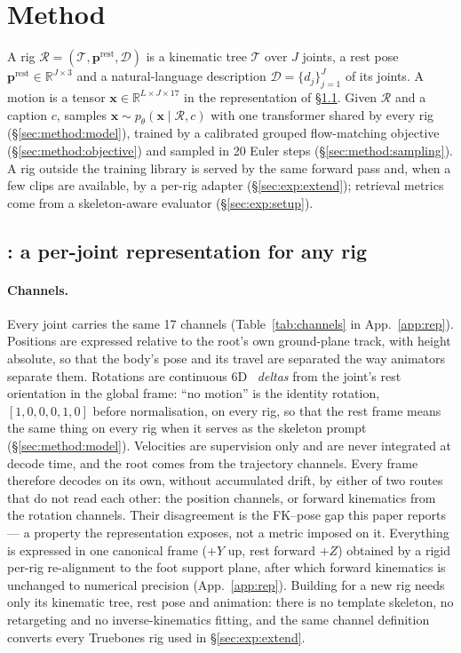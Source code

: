 \section{Method}\label{sec:method}

A rig $\mathcal{R}=(\mathcal{T},\mathbf{p}^{\mathrm{rest}},\mathcal{D})$ is a kinematic tree
$\mathcal{T}$ over $J$ joints, a rest pose $\mathbf{p}^{\mathrm{rest}}\in\mathbb{R}^{J\times3}$ and
a natural-language description $\mathcal{D}=\{d_j\}_{j=1}^{J}$ of its joints. A motion is a tensor
$\mathbf{x}\in\mathbb{R}^{L\times J\times 17}$ in the \rep{} representation of
\S\ref{sec:method:rep}. Given $\mathcal{R}$ and a caption $c$, \method{} samples
$\mathbf{x}\sim p_\theta(\mathbf{x}\mid\mathcal{R},c)$ with one transformer shared by every rig
(\S\ref{sec:method:model}), trained by a calibrated grouped flow-matching objective
(\S\ref{sec:method:objective}) and sampled in 20 Euler steps
(\S\ref{sec:method:sampling}). A rig outside the training library is served by the same
forward pass and, when a few clips are available, by a per-rig adapter (\S\ref{sec:exp:extend}); retrieval
metrics come from a skeleton-aware evaluator (\S\ref{sec:exp:setup}).

\subsection{\rep{}: a per-joint representation for any rig}\label{sec:method:rep}

\paragraph{Channels.} Every joint carries the same 17 channels (Table~\ref{tab:channels} in App.~\ref{app:rep}). Positions
are expressed relative to the root's own ground-plane track, with height absolute, so
that the body's pose and its travel are separated the way animators separate them. Rotations are
continuous 6D~\citep{zhou2019continuity} \emph{deltas} from the joint's rest orientation in the global
frame: ``no motion'' is the identity rotation, $[1,0,0,0,1,0]$ before normalisation, on every rig,
so that the rest frame means the same thing on every rig when it serves as the skeleton prompt
(\S\ref{sec:method:model}). Velocities are supervision only and are never
integrated at decode time, and the root comes from the trajectory channels. Every frame therefore decodes on its
own, without accumulated drift, by either of two routes that do not read each other: the position channels, or
forward kinematics from the rotation channels. Their disagreement is the FK--pose gap this paper reports --- a property
the representation exposes, not a metric imposed on it. Everything is expressed in one canonical frame ($+Y$ up, rest forward $+Z$) obtained
by a rigid per-rig re-alignment to the foot support plane, after which forward kinematics is
unchanged to numerical precision (App.~\ref{app:rep}). Building \rep{} for a new rig needs only its
kinematic tree, rest pose and animation: there is no template skeleton, no retargeting and no
inverse-kinematics fitting, and the same channel definition converts every
Truebones rig used in \S\ref{sec:exp:extend}.

